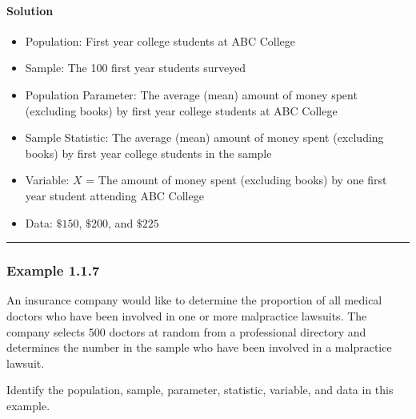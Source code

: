 \documentclass[letterpaper,10pt,english]{jupyterBook}
\begin{document}
\paragraph{Solution}
\label{\detokenize{Ch1 Sampling and Data/1.1 Key Terms in Statistics:id5}}\begin{itemize}
\item {} 
\sphinxAtStartPar
Population: First year college students at ABC College

\item {} 
\sphinxAtStartPar
Sample: The 100 first year students surveyed

\item {} 
\sphinxAtStartPar
Population Parameter: The average (mean) amount of money spent (excluding books) by first year college students at ABC College

\item {} 
\sphinxAtStartPar
Sample Statistic: The average (mean) amount of money spent (excluding books) by first year college students in the sample

\item {} 
\sphinxAtStartPar
Variable: \(X\) = The amount of money spent (excluding books) by one first year student attending ABC College

\item {} 
\sphinxAtStartPar
Data: \(\$150\), \(\$200\), and \(\$225\)

\end{itemize}


\bigskip\hrule\bigskip



\subsubsection{Example 1.1.7}
\label{\detokenize{Ch1 Sampling and Data/1.1 Key Terms in Statistics:example-1-1-7}}
\sphinxAtStartPar
An insurance company would like to determine the proportion of all medical doctors who have been involved in one or more malpractice lawsuits. The company selects 500 doctors at random from a professional directory and determines the number in the sample who have been involved in a malpractice lawsuit.

\sphinxAtStartPar
Identify the population, sample, parameter, statistic, variable, and data in this example.
\end{document}
